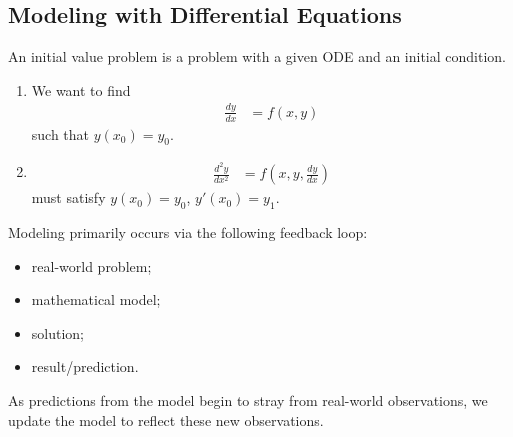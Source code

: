 \documentclass[10pt]{mypackage}
\begin{document}
  \subsection{Modeling with Differential Equations}%
  \begin{definition}
  An initial value problem is a problem with a given ODE and an initial condition.
  \end{definition}
  \begin{example}\hfill
    \begin{enumerate}[(1)]
      \item We want to find
    \begin{align*}
      \frac{dy}{dx} &= f\left(x,y\right)
    \end{align*}
    such that $y\left(x_0\right) = y_0$.
    \item
      \begin{align*}
        \frac{d^2y}{dx^2} &= f\left(x,y,\frac{dy}{dx}\right)
      \end{align*}
      must satisfy $y\left(x_0\right) = y_0$, $y'\left(x_0\right) = y_1$.
    \end{enumerate}
  \end{example}
  Modeling primarily occurs via the following feedback loop:
  \begin{itemize}
    \item real-world problem;
    \item mathematical model;
    \item solution;
    \item result/prediction.
  \end{itemize}
  As predictions from the model begin to stray from real-world observations, we update the model to reflect these new observations.
\end{document}
